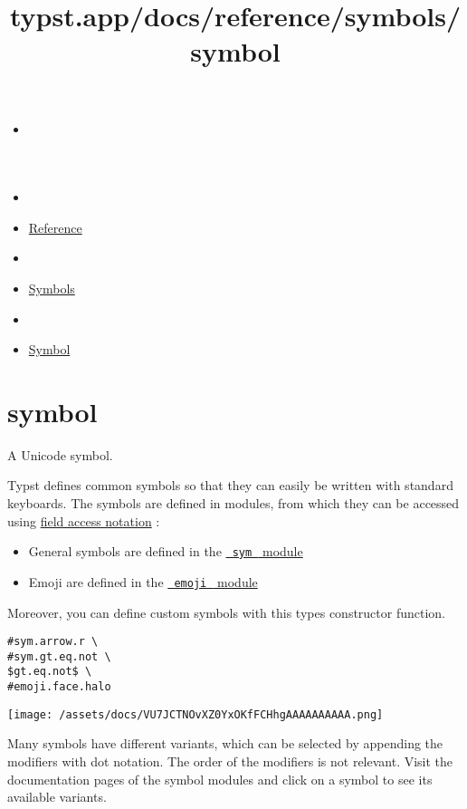 \title{typst.app/docs/reference/symbols/symbol}

\begin{itemize}
\tightlist
\item
  \href{/docs}{}
\item
  
\item
  \href{/docs/reference/}{Reference}
\item
  
\item
  \href{/docs/reference/symbols/}{Symbols}
\item
  
\item
  \href{/docs/reference/symbols/symbol/}{Symbol}
\end{itemize}

\section{\texorpdfstring{{ symbol }}{ symbol }}\label{summary}

A Unicode symbol.

Typst defines common symbols so that they can easily be written with
standard keyboards. The symbols are defined in modules, from which they
can be accessed using \href{/docs/reference/scripting/\#fields}{field
access notation} :

\begin{itemize}
\tightlist
\item
  General symbols are defined in the
  \href{/docs/reference/symbols/sym/}{\texttt{\ sym\ } module}
\item
  Emoji are defined in the
  \href{/docs/reference/symbols/emoji/}{\texttt{\ emoji\ } module}
\end{itemize}

Moreover, you can define custom symbols with this type\textquotesingle s
constructor function.

\begin{verbatim}
#sym.arrow.r \
#sym.gt.eq.not \
$gt.eq.not$ \
#emoji.face.halo
\end{verbatim}

\texttt{[image: /assets/docs/VU7JCTNOvXZ0YxOKfFCHhgAAAAAAAAAA.png]}

Many symbols have different variants, which can be selected by appending
the modifiers with dot notation. The order of the modifiers is not
relevant. Visit the documentation pages of the symbol modules and click
on a symbol to see its available variants.


